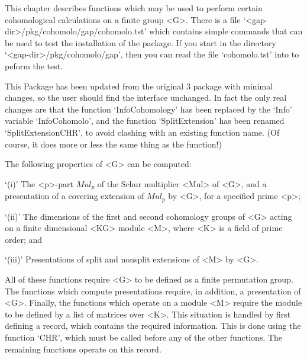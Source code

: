 


This chapter describes functions which may be used to perform certain
cohomological calculations on a finite group <G>.
There is a file `<gap-dir>/pkg/cohomolo/gap/cohomolo.tst' which contains
simple commands that can be used to test the installation of the package.
If you start {\GAP} in the directory `<gap-dir>/pkg/cohomolo/gap', then
you can read the file `cohomolo.tst' into {\GAP} to peform the test. 

This Package has been updated from the original {\GAP}3 package
with minimal changes, so the user should find the interface unchanged.
In fact the only real changes are that the function `InfoCohomology' has been
replaced by the `Info' variable `InfoCohomolo', and the function
`SplitExtension' has been renamed `SplitExtensionCHR', to avoid clashing
with an existing {\GAP} function name. (Of course, it does more or less
the same thing as the {\GAP} function!)

The following properties of <G> can be computed:

\beginitems
`(i)' The <p>-part $Mul_p$ of the Schur multiplier <Mul> of <G>,
and a presentation
of a covering extension of $Mul_p$ by <G>, for a specified prime <p>;

`(ii)' The dimensions of the first and second cohomology groups of <G>
acting on a finite dimensional <KG> module <M>, where <K> is a field of prime
order; and

`(iii)' Presentations of split and nonsplit extensions of <M> by <G>.
\enditems

All of these functions require <G> to be defined as a finite permutation
group. The functions which compute presentations require, in addition, a
presentation of <G>. Finally, the functions which operate on a module <M>
require the module to be defined by a list of matrices over <K>. This
situation is handled by first defining a {\GAP} record, which contains the
required information. This is done using the function `CHR', which must be
called before any of the other functions. The remaining functions operate
on this record.

